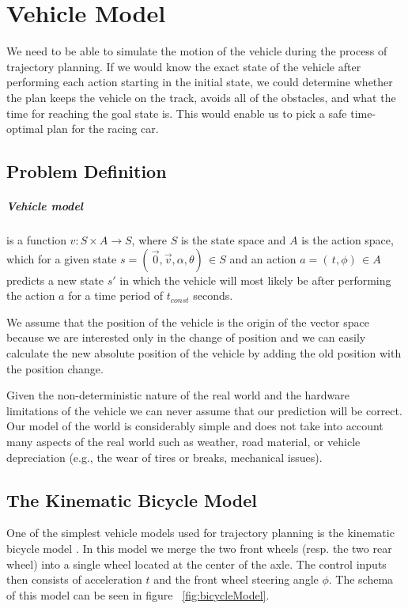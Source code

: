 \chapter{Vehicle Model}

We need to be able to simulate the motion of the vehicle during the process of trajectory planning. If we would know the exact state of the vehicle after performing each action starting in the initial state, we could determine whether the plan keeps the vehicle on the track, avoids all of the obstacles, and what the time for reaching the goal state is. This would enable us to pick a safe time-optimal plan for the racing car.

\section{Problem Definition}

\paragraph{Vehicle model} is a function $v: S \times A \rightarrow S$, where $S$ is the state space and $A$ is the action space, which for a given state $s = ( \, \vec{0}, \vec{v}, \alpha, \theta ) \, \in S$ and an action $a = ( \, t, \phi ) \, \in A$ predicts a new state $s\prime$ in which the vehicle will most likely be after performing the action $a$ for a time period of $t_{const}$ seconds.

We assume that the position of the vehicle is the origin of the vector space because we are interested only in the change of position and we can easily calculate the new absolute position of the vehicle by adding the old position with the position change.

Given the non-deterministic nature of the real world and the hardware limitations of the vehicle we can never assume that our prediction will be correct. Our model of the world is considerably simple and does not take into account many aspects of the real world such as weather, road material, or vehicle depreciation (e.g., the wear of tires or breaks, mechanical issues). 


\section{The Kinematic Bicycle Model}

One of the simplest vehicle models used for trajectory planning is the kinematic bicycle model \cite{bicycleModel}. In this model we merge the two front wheels (resp. the two rear wheel) into a single wheel located at the center of the axle. The control inputs then consists of acceleration \(t\) and the front wheel steering angle \(\phi\). The schema of this model can be seen in figure ~\ref{fig:bicycleModel}.

